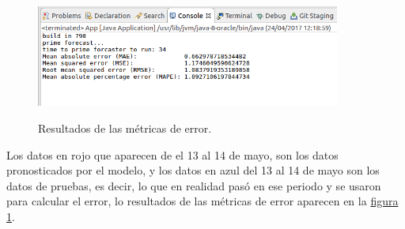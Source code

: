\begin{figure}
	\caption{Resultados de las métricas de error. }
	\includegraphics[width=10cm]{img/resultadosSerieDeTiempo1.png}
	\label{fig:resultadosMetricasSerieTiempo}
\end{figure}
Los datos en rojo que aparecen de el 13 al 14 de mayo, son los datos pronosticados por el modelo, y los datos en azul del 13 al 14 de mayo son los datos de pruebas, es decir, lo que en realidad pasó en ese periodo y se usaron para calcular el error, lo resultados de las métricas de error aparecen en la \hyperref[fig:resultadosMetricasSerieTiempo]{figura \ref{fig:resultadosMetricasSerieTiempo}}.

